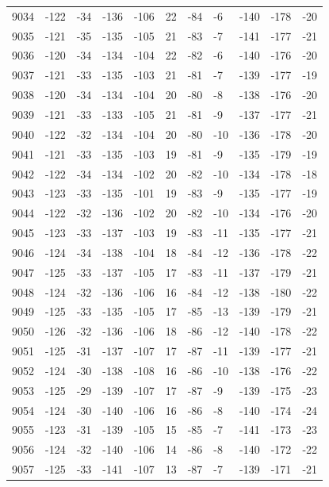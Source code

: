 \begin{table}[H]
\begin{tabular}{lllllllllll}
9034 & -122 & -34 & -136 & -106 & 22 & -84 & -6 & -140 & -178 & -20 \\
9035 & -121 & -35 & -135 & -105 & 21 & -83 & -7 & -141 & -177 & -21 \\
9036 & -120 & -34 & -134 & -104 & 22 & -82 & -6 & -140 & -176 & -20 \\
9037 & -121 & -33 & -135 & -103 & 21 & -81 & -7 & -139 & -177 & -19 \\
9038 & -120 & -34 & -134 & -104 & 20 & -80 & -8 & -138 & -176 & -20 \\
9039 & -121 & -33 & -133 & -105 & 21 & -81 & -9 & -137 & -177 & -21 \\
9040 & -122 & -32 & -134 & -104 & 20 & -80 & -10 & -136 & -178 & -20 \\
9041 & -121 & -33 & -135 & -103 & 19 & -81 & -9 & -135 & -179 & -19 \\
9042 & -122 & -34 & -134 & -102 & 20 & -82 & -10 & -134 & -178 & -18 \\
9043 & -123 & -33 & -135 & -101 & 19 & -83 & -9 & -135 & -177 & -19 \\
9044 & -122 & -32 & -136 & -102 & 20 & -82 & -10 & -134 & -176 & -20 \\
9045 & -123 & -33 & -137 & -103 & 19 & -83 & -11 & -135 & -177 & -21 \\
9046 & -124 & -34 & -138 & -104 & 18 & -84 & -12 & -136 & -178 & -22 \\
9047 & -125 & -33 & -137 & -105 & 17 & -83 & -11 & -137 & -179 & -21 \\
9048 & -124 & -32 & -136 & -106 & 16 & -84 & -12 & -138 & -180 & -22 \\
9049 & -125 & -33 & -135 & -105 & 17 & -85 & -13 & -139 & -179 & -21 \\
9050 & -126 & -32 & -136 & -106 & 18 & -86 & -12 & -140 & -178 & -22 \\
9051 & -125 & -31 & -137 & -107 & 17 & -87 & -11 & -139 & -177 & -21 \\
9052 & -124 & -30 & -138 & -108 & 16 & -86 & -10 & -138 & -176 & -22 \\
9053 & -125 & -29 & -139 & -107 & 17 & -87 & -9 & -139 & -175 & -23 \\
9054 & -124 & -30 & -140 & -106 & 16 & -86 & -8 & -140 & -174 & -24 \\
9055 & -123 & -31 & -139 & -105 & 15 & -85 & -7 & -141 & -173 & -23 \\
9056 & -124 & -32 & -140 & -106 & 14 & -86 & -8 & -140 & -172 & -22 \\
9057 & -125 & -33 & -141 & -107 & 13 & -87 & -7 & -139 & -171 & -21 \\

\end{tabular}
\end{table}

